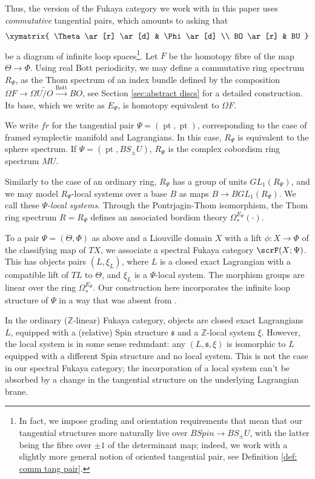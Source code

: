 \documentclass{TPmod}
\newcommand{\pt}{\operatorname{pt}}
\def\bZ{\mathbb{Z}}
\def\bZ{\mathbb{Z}}
\numberwithin{equation}{section}
\begin{document}
Thus, the version of the Fukaya category we work with in this paper uses \emph{commutative} tangential pairs, which amounts to asking that 
\[
\xymatrix{
\Theta \ar[r] \ar[d] & \Phi \ar[d] \\
BO \ar[r] & BU
}
\]
be a diagram of infinite loop spaces\footnote{In fact, we impose grading and orientation requirements that mean that our tangential structures more naturally live over $BSpin \to BS_{\pm}U$, with the latter being the fibre over $\pm 1$ of the  determinant map; indeed, we work with a slightly more general notion of oriented tangential pair, see  Definition \ref{def: comm tang pair}.}.  Let $F$ be the homotopy fibre of the map $\Theta \to \Phi$. Using real Bott periodicity, we may define a commutative ring spectrum $R_\Psi$, as the Thom spectrum of an index bundle defined by the composition $\Omega F \to \Omega\widetilde{U/O} \xrightarrow{\mathrm{Bott}} BO$, see Section \ref{sec:abstract discs} for a detailed construction. Its base, which we write as $E_\Psi$, is homotopy equivalent to $\Omega F$.

\begin{ex}
    We write $fr$ for the tangential pair $\Psi=(\pt, \pt)$, corresponding to the case of framed symplectic manifold and Lagrangians. In this case, $R_\Psi$ is equivalent to the sphere spectrum. If $\Psi=(\pt, BS_\pm U)$, $R_\Psi$ is the complex cobordism ring spectrum $MU$.
\end{ex}

Similarly to the case of an ordinary ring, $R_\Psi$ has a group of units $GL_1(R_\Psi)$, and we may model $R_\Psi$-local systems over a base $B$ as maps $B \to BGL_1(R_\Psi)$. We call these \emph{$\Psi$-local systems}. Through the Pontrjagin-Thom isomorphism, the Thom ring spectrum $R = R_{\Psi}$ defines an associated bordism theory $\Omega_*^{E_{\Psi}}(\cdot)$. 

To a pair $\Psi=(\Theta, \Phi)$ as above and a Liouville domain $X$ with a lift $\phi: X \to \Phi$ of the classifying map of $TX$, we associate a spectral Fukaya category $\scrF(X; \Psi)$. This has objects pairs $(L, \xi_L)$, where $L$ is a closed exact Lagrangian with a compatible lift of $TL$ to $\Theta$, and $\xi_L$ is a $\Psi$-local system. The morphism groups are linear over the ring $\Omega_*^{E_{\Psi}}$. Our construction here incorporates the infinite loop structure of $\Psi$ in a way that was absent from \cite{PS2}.

\begin{rmk}
    In the ordinary ($\bZ$-linear) Fukaya category, objects are closed exact Lagrangians $L$, equipped with a (relative) Spin structure $\mathfrak{s}$ and a $\bZ$-local system $\xi$. However, the local system is in some sense redundant: any $(L, \mathfrak{s}, \xi)$ is isomorphic to $L$ equipped with a different Spin structure and no local system. This is not the case in our spectral Fukaya category; the incorporation of a local system can't be absorbed by a change in the tangential structure on the underlying Lagrangian brane.
\end{rmk}
\end{document}
